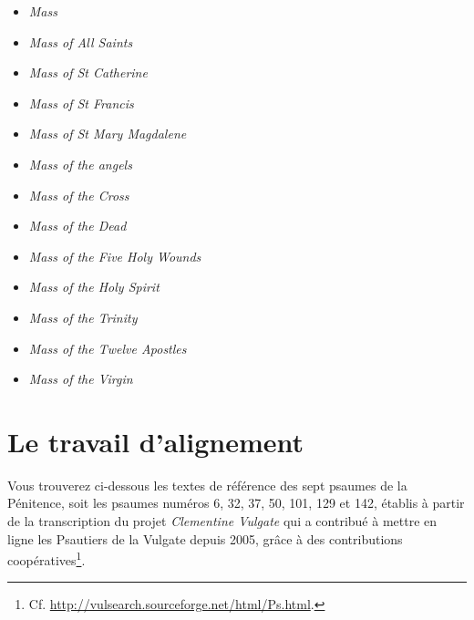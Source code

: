 \documentclass[a4paper,12pt,twoside]{book}
\begin{document}
	\begin{itemize}
\item \textit{Mass}
\item \textit{Mass of All Saints}
\item \textit{Mass of St Catherine}
\item \textit{Mass of St Francis}
\item \textit{Mass of St Mary Magdalene}
\item \textit{Mass of the angels}
\item \textit{Mass of the Cross}
\item \textit{Mass of the Dead}
\item \textit{Mass of the Five Holy Wounds}
\item \textit{Mass of the Holy Spirit}
\item \textit{Mass of the Trinity}
\item \textit{Mass of the Twelve Apostles}
\item \textit{Mass of the Virgin}
	\end{itemize}
	
	\section{\label{alignement}Le travail d'alignement}
	
	Vous trouverez ci-dessous les textes de référence des sept psaumes de la Pénitence, soit les psaumes numéros 6, 32, 37, 50, 101, 129 et 142, établis à partir de la transcription du projet \og \textit{Clementine Vulgate}\fg{} qui a contribué à mettre en ligne les Psautiers de la Vulgate depuis 2005, grâce à des contributions coopératives\footnote{Cf. \url{http://vulsearch.sourceforge.net/html/Ps.html}.}.
	
\end{document}
